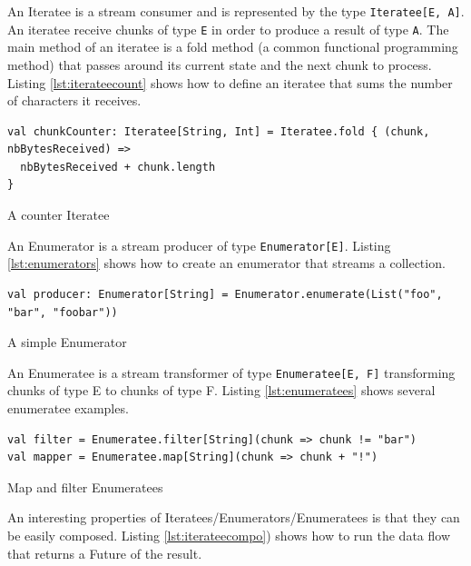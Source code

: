 An Iteratee is a stream consumer and is represented by the type \verb|Iteratee[E, A]|. An iteratee receive chunks of type \verb|E| 
in order to produce a result of type \verb|A|. The main method of an iteratee is a fold method (a common functional programming method) that passes around its current state and the next chunk to process.
Listing \ref{lst:iterateecount} shows how to define an iteratee that sums the number of characters it receives.

\begin{listing}[h]
\begin{verbatim}
val chunkCounter: Iteratee[String, Int] = Iteratee.fold { (chunk, nbBytesReceived) =>
  nbBytesReceived + chunk.length
}
\end{verbatim}
\caption{A counter Iteratee}
\label{lst:iterateecount}
\end{listing}

An Enumerator is a stream producer of type \verb|Enumerator[E]|. Listing \ref{lst:enumerators} shows how to create an enumerator that streams a collection.

\begin{listing}[h]
\begin{verbatim}
val producer: Enumerator[String] = Enumerator.enumerate(List("foo", "bar", "foobar"))
\end{verbatim}
\caption{A simple Enumerator}
\label{lst:enumerators}
\end{listing}

An Enumeratee is a stream transformer of type \verb|Enumeratee[E, F]| transforming chunks of type E to chunks of type F.
Listing \ref{lst:enumeratees} shows several enumeratee examples.

\begin{listing}[h]
\begin{verbatim}
val filter = Enumeratee.filter[String](chunk => chunk != "bar")
val mapper = Enumeratee.map[String](chunk => chunk + "!")
\end{verbatim}
\caption{Map and filter Enumeratees}
\label{lst:enumeratees}
\end{listing}

An interesting properties of Iteratees/Enumerators/Enumeratees is that they can be easily composed. Listing \ref{lst:iterateecompo}) shows how to
run the data flow that returns a Future of the result.

